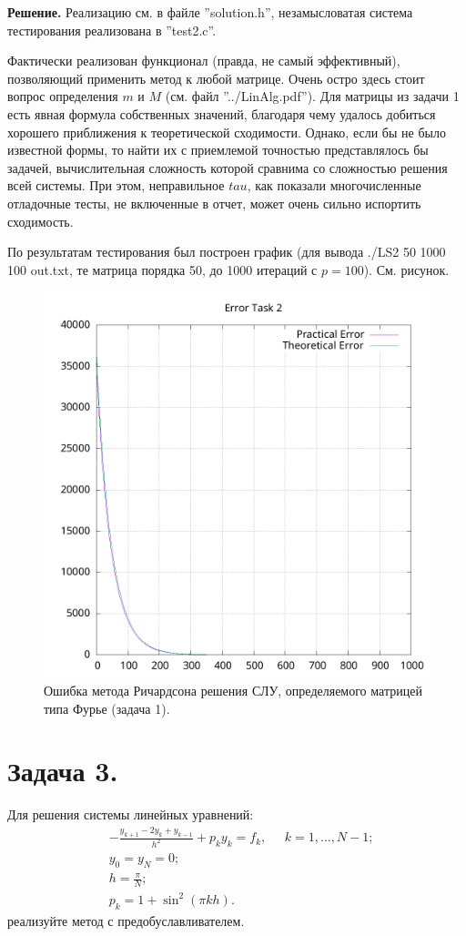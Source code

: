 \documentclass[14pt,a4paper]{extarticle}
\newcommand{\1}{\mathbbm{1}}
\begin{document}
\textbf{Решение.} 
Реализацию см. в файле ''solution.h'', незамысловатая система тестирования реализована в ''test2.c''. \par
Фактически реализован функционал (правда, не самый эффективный), позволяющий применить метод к любой матрице.
Очень остро здесь стоит вопрос определения $m$ и $M$ (см. файл ''../LinAlg.pdf''). Для матрицы из задачи 1 
есть явная формула собственных значений, благодаря чему удалось добиться хорошего приближения к теоретической сходимости. 
Однако, если бы не было известной формы, то найти их с приемлемой точностью представлялось бы задачей, вычислительная сложность которой
сравнима со сложностью решения всей системы. При этом, неправильное $tau$, как показали многочисленные отладочные тесты,
не включенные в отчет, может очень сильно испортить сходимость. \par
По результатам тестирования был построен график (для вывода ./LS2 50 1000 100 out.txt, те матрица порядка 50, до 1000 итераций 
с $p = 100$). См. рисунок.

\begin{figure}
    \centering
    \includegraphics[scale=0.55]{Error2.png}
    \caption{Ошибка метода Ричардсона решения СЛУ, определяемого матрицей типа Фурье (задача 1).}
\end{figure}


\section{\textbf{Задача 3.}} Для решения системы линейных уравнений:
\begin{align*}
& -\frac{y_{k+1} - 2 y_k + y_{k-1}}{h^2} + p_k y_k = f_k, \;\;\;\;\; k = 1, \ldots, N - 1; \\
& y_0 = y_N = 0; \\
& h = \frac{\pi}{N}; \\
& p_k = 1 + \sin^2(\pi k h).
\end{align*}
реализуйте метод с предобуславливателем.
\end{document}
